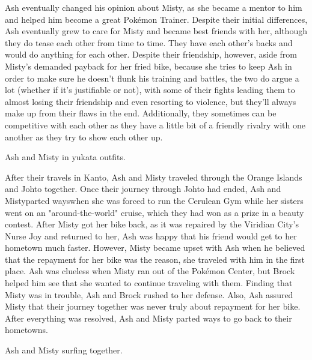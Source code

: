 \documentclass[a4paper,12pt]{article}
\begin{document}
Ash eventually changed his opinion about Misty, as she became a mentor to him and helped him become a great Pokémon Trainer. Despite their initial differences, Ash eventually grew to care for Misty and became best friends with her, although they do tease each other from time to time. They have each other's backs and would do anything for each other. Despite their friendship, however, aside from Misty's demanded payback for her fried bike, because she tries to keep Ash in order to make sure he doesn't flunk his training and battles, the two do argue a lot (whether if it's justifiable or not), with some of their fights leading them to almost losing their friendship and even resorting to violence, but they'll always make up from their flaws in the end. Additionally, they sometimes can be competitive with each other as they have a little bit of a friendly rivalry with one another as they try to show each other up.\\ \par \vspace{0.5cm}

Ash and Misty in yukata outfits.\\ \par \vspace{0.5cm}

After their travels in Kanto, Ash and Misty traveled through the Orange Islands and Johto together. Once their journey through Johto had ended, Ash and Mistyparted wayswhen she was forced to run the Cerulean Gym while her sisters went on an "around-the-world" cruise, which they had won as a prize in a beauty contest. After Misty got her bike back, as it was repaired by the Viridian City's Nurse Joy and returned to her, Ash was happy that his friend would get to her hometown much faster. However, Misty became upset with Ash when he believed that the repayment for her bike was the reason, she traveled with him in the first place. Ash was clueless when Misty ran out of the Pokémon Center, but Brock helped him see that she wanted to continue traveling with them. Finding that Misty was in trouble, Ash and Brock rushed to her defense. Also, Ash assured Misty that their journey together was never truly about repayment for her bike. After everything was resolved, Ash and Misty parted ways to go back to their hometowns.\\ \par \vspace{0.5cm}

Ash and Misty surfing together.\\ \par \vspace{0.5cm}
\end{document}
